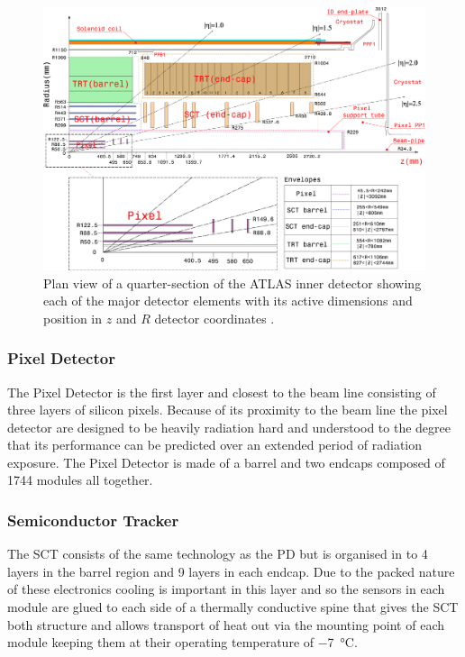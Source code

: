 		\begin{figure}[h!]
			\begin{center}
				\includegraphics[width=0.99\linewidth]{images/FigID26-mod-011107.eps}
			\end{center}
			\caption{Plan view of a quarter-section of the ATLAS inner detector showing each of the major detector elements with its active dimensions and position in $z$ and $R$ detector coordinates \cite{Aad:1129811}.}
			\label{fig:ATLAS_inner_config}
		\end{figure}



		\subsubsection*{Pixel Detector} 

		The Pixel Detector is the first layer and closest to the beam line consisting of three layers of silicon pixels. Because of its proximity to the beam line the pixel detector are designed to be heavily radiation hard and understood to the degree that its performance can be predicted over an extended period of radiation exposure. The Pixel Detector is made of a barrel and two endcaps composed of 1744 modules all together. 


		\subsubsection*{Semiconductor Tracker}

		The SCT consists of the same technology as the PD but is organised in to 4 layers in the barrel region and 9 layers in each endcap. Due to the packed nature of these electronics cooling is important in this layer and so the sensors in each module are glued to each side of a thermally conductive spine that gives the SCT both structure and allows transport of heat out via the mounting point of each module keeping them at their operating temperature of \SI{-7}{\degreeCelsius}.



